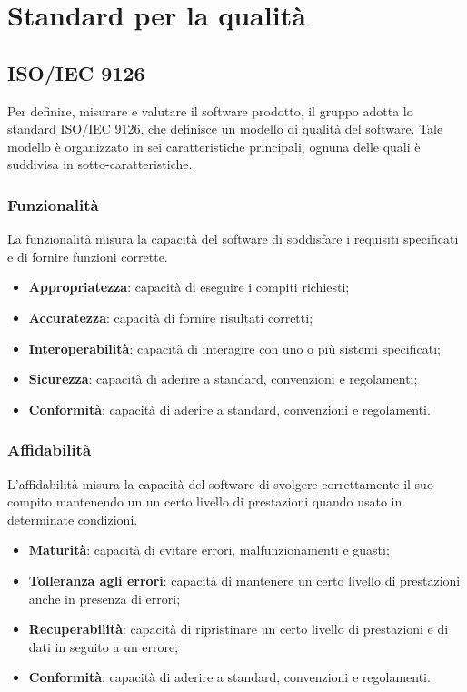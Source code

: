 \section{Standard per la qualità}

\subsection{ISO/IEC 9126}
Per definire, misurare e valutare il software prodotto, il gruppo adotta lo 
standard ISO/IEC 9126, che definisce un modello di qualità del software. Tale 
modello è organizzato in sei caratteristiche principali, 
ognuna delle quali è suddivisa in sotto-caratteristiche.

\subsubsection{Funzionalità}
La funzionalità misura la capacità del software di soddisfare i requisiti specificati e di fornire funzioni corrette.
\begin{itemize}
    \item \textbf{Appropriatezza}: capacità di eseguire i compiti richiesti;
    \item \textbf{Accuratezza}: capacità di fornire risultati corretti;
    \item \textbf{Interoperabilità}: capacità di interagire con uno o più sistemi specificati;
    \item \textbf{Sicurezza}: capacità di aderire a standard, convenzioni e regolamenti;
    \item \textbf{Conformità}: capacità di aderire a standard, convenzioni e regolamenti.
\end{itemize}

\subsubsection{Affidabilità}
L'affidabilità misura la capacità del software di svolgere correttamente il suo compito
mantenendo un un certo livello di prestazioni quando usato in determinate condizioni.
\begin{itemize}
    \item \textbf{Maturità}: capacità di evitare errori, malfunzionamenti e guasti;
    \item \textbf{Tolleranza agli errori}: capacità di mantenere un certo livello di prestazioni anche in presenza di errori;
    \item \textbf{Recuperabilità}: capacità di ripristinare un certo livello di prestazioni e di dati in seguito a un errore;
    \item \textbf{Conformità}: capacità di aderire a standard, convenzioni e regolamenti.
\end{itemize}

